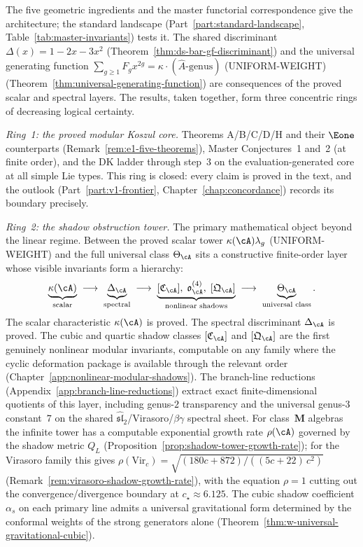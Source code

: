 The five geometric ingredients and the master functorial correspondence
give the architecture; the standard landscape (Part~\ref{part:standard-landscape},
Table~\ref{tab:master-invariants}) tests it. The shared discriminant
$\Delta(x) = 1 - 2x - 3x^2$
(Theorem~\ref{thm:ds-bar-gf-discriminant}) and the universal
generating function
$\sum_{g \geq 1} F_g x^{2g} = \kappa \cdot (\hat{A}\text{-genus})$ \textup{(UNIFORM-WEIGHT)}
(Theorem~\ref{thm:universal-generating-function}) are consequences
of the proved scalar and spectral layers.
The results, taken together, form three concentric rings of decreasing
logical certainty.

\emph{Ring~1: the proved modular Koszul core.}
Theorems A/B/C/D/H and their $\Eone$ counterparts
(Remark~\ref{rem:e1-five-theorems}),
Master Conjectures~1 and~2 (at finite order),
and the DK ladder
through step~3 on the evaluation-generated core at all simple Lie
types.
This ring is closed: every claim is proved in the text, and
the outlook (Part~\ref{part:v1-frontier}, Chapter~\ref{chap:concordance}) records
its boundary precisely.

\emph{Ring~2: the shadow obstruction tower.}
The primary mathematical object beyond the linear regime.
Between the proved scalar tower $\kappa(\cA)\lambda_g$ \textup{(UNIFORM-WEIGHT)} and the full
universal class $\Theta_\cA$ sits a constructive finite-order layer
whose visible invariants form a hierarchy:
\[
\underbrace{\kappa(\cA)}_{\text{scalar}}
\;\longrightarrow\;
\underbrace{\Delta_\cA}_{\text{spectral}}
\;\longrightarrow\;
\underbrace{[\mathfrak C_\cA],\;\mathfrak o_\cA^{(4)},\;
 [\mathfrak Q_\cA]}_{\text{nonlinear shadows}}
\;\longrightarrow\;
\underbrace{\Theta_\cA}_{\text{universal class}}.
\]
The scalar characteristic $\kappa(\cA)$ is proved. The spectral
discriminant $\Delta_\cA$ is proved. The cubic and quartic shadow
classes $[\mathfrak C_\cA]$ and $[\mathfrak Q_\cA]$ are the first
genuinely nonlinear modular invariants, computable on any family
where the cyclic deformation package is available through the
relevant order
(Chapter~\ref{app:nonlinear-modular-shadows}).
The branch-line reductions
(Appendix~\ref{app:branch-line-reductions}) extract exact
finite-dimensional quotients of this layer, including genus-$2$
transparency and the universal genus-$3$ constant~$7$ on the shared
$\widehat{\mathfrak{sl}}_2$/Virasoro/$\beta\gamma$ spectral sheet.
For class~$\mathbf{M}$ algebras the infinite tower has a computable
exponential growth rate $\rho(\cA)$ governed by the shadow metric
$Q_L$ (Proposition~\ref{prop:shadow-tower-growth-rate}); for the
Virasoro family this gives
$\rho(\mathrm{Vir}_c) =
\sqrt{(180c{+}872)/((5c{+}22)\,c^2)}$
(Remark~\ref{rem:virasoro-shadow-growth-rate}), with the
equation $\rho = 1$ cutting out the convergence/divergence
boundary at $c_\star \approx 6.125$.
The cubic shadow coefficient $\alpha_s$ on each primary line
admits a universal gravitational form determined by the conformal
weights of the strong generators alone
(Theorem~\ref{thm:w-universal-gravitational-cubic}).

